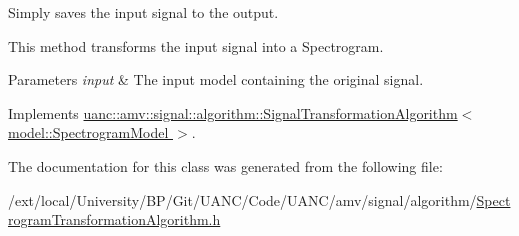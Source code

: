 Simply saves the input signal to the output. 

This method transforms the input signal into a Spectrogram.


\begin{DoxyParams}{Parameters}
{\em input} & The input model containing the original signal. \\
\hline
\end{DoxyParams}


Implements \hyperlink{classuanc_1_1amv_1_1signal_1_1algorithm_1_1_signal_transformation_algorithm_a40dee2d59e84244373cacc9c472514d6}{uanc\+::amv\+::signal\+::algorithm\+::\+Signal\+Transformation\+Algorithm$<$ model\+::\+Spectrogram\+Model $>$}.



The documentation for this class was generated from the following file\+:\begin{DoxyCompactItemize}
\item 
/ext/local/\+University/\+B\+P/\+Git/\+U\+A\+N\+C/\+Code/\+U\+A\+N\+C/amv/signal/algorithm/\hyperlink{_spectrogram_transformation_algorithm_8h}{Spectrogram\+Transformation\+Algorithm.\+h}\end{DoxyCompactItemize}
